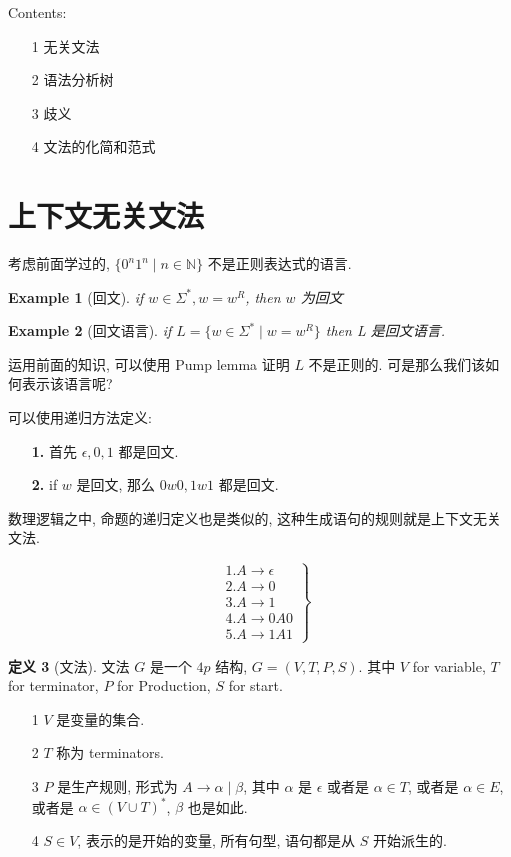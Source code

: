 \documentclass[12pt]{ctexart}
\theoremstyle{definition}
\theoremstyle{definition}
\newtheorem{definition}{定义}[section]
\theoremstyle{plain}
\newtheorem{exam}[definition]{Example}
\theoremstyle{remark}
\begin{document}
Contents: 
\begin{itemize}
\item [1] 无关文法 
\item [2] 语法分析树
\item [3]  歧义
\item [4] 文法的化简和范式
\end{itemize}

\section{上下文无关文法}\label{sec:def}
考虑前面学过的, \(\{  0 ^{n} 1 ^{n} \mid n \in \mathbb{N}\}\) 不是正则表达式的语言. 



\begin{exam}[回文]
if \(w \in \Sigma ^{*} , w = w ^{R}\), then \(w\) 为回文
\end{exam}

\begin{exam}[回文语言]
	if \( L =  \{ w \in \Sigma ^{* } \mid w = w ^{R} \}\)
	then L 是回文语言. 
\end{exam}
运用前面的知识, 可以使用 Pump lemma 证明 \(L\) 不是正则的. 可是那么我们该如何表示该语言呢? 

可以使用递归方法定义: 
\begin{itemize}
\item [\textbf{1.}] 首先 \(\epsilon, 0 , 1\) 都是回文.
\item [\textbf{2.}] if \(w\) 是回文, 那么 \( 0  w 0 , 1 w 1 \) 都是回文. 
\end{itemize}
数理逻辑之中, 命题的递归定义也是类似的, 这种生成语句的规则就是上下文无关文法. 




\begin{equation}
\left.
\begin{aligned}
&1. A \to\epsilon \\ 
&2. A \to 0 \\ 
&3. A \to 1 \\ 
&4. A \to 0 A 0 \\ 
&5. A \to 1A1
\end{aligned}
\right\}
\end{equation}

\begin{definition}[文法]
	文法 \(G\) 是一个 \(4p\) 结构, \(G = (V , T , P , S ) \).
	其中 \(V \) for variable, \(T\) for terminator, \(P\) for Production, \(S\) for start.
	\begin{itemize}
	\item [1]  \(V\) 是变量的集合. 
	\item [2]  \(T\) 称为 terminators. 
	\item [3]  \(P\) 是生产规则, 形式为 \(A \to\alpha \mid\beta\), 其中 \(\alpha\) 是 \( \epsilon \) 或者是 \(\alpha \in T \), 或者是 \(\alpha \in E \), 或者是 \(\alpha \in (V\cup T )^{*} \), \(\beta \) 也是如此. 
	\item [4]  \( S \in V\), 表示的是开始的变量, 所有句型, 语句都是从 \( S\) 开始派生的. 
	\end{itemize}
\end{definition}
\end{document}
